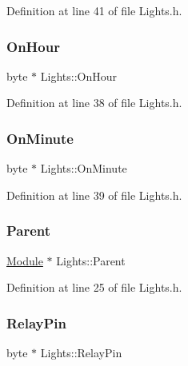 Definition at line 41 of file Lights.\+h.

\mbox{\label{class_lights_a40dc32d057dbf4c0e7e840fce2ac3a2d}} 
\subsubsection{\texorpdfstring{On\+Hour}{OnHour}}
{\footnotesize\ttfamily byte $\ast$ Lights\+::\+On\+Hour\hspace{0.3cm}{\ttfamily [protected]}}



Definition at line 38 of file Lights.\+h.

\mbox{\label{class_lights_ac94ddb9da64af75953b178fb852ef936}} 
\subsubsection{\texorpdfstring{On\+Minute}{OnMinute}}
{\footnotesize\ttfamily byte $\ast$ Lights\+::\+On\+Minute\hspace{0.3cm}{\ttfamily [protected]}}



Definition at line 39 of file Lights.\+h.

\mbox{\label{class_lights_aae73ad0f2de1a24e5c12add1d302e367}} 
\subsubsection{\texorpdfstring{Parent}{Parent}}
{\footnotesize\ttfamily \hyperlink{class_module}{Module} $\ast$ Lights\+::\+Parent\hspace{0.3cm}{\ttfamily [protected]}}



Definition at line 25 of file Lights.\+h.

\mbox{\label{class_lights_adb3fe393e7ccae4ac7b3509b2ab2b2a2}} 
\subsubsection{\texorpdfstring{Relay\+Pin}{RelayPin}}
{\footnotesize\ttfamily byte $\ast$ Lights\+::\+Relay\+Pin\hspace{0.3cm}{\ttfamily [protected]}}



